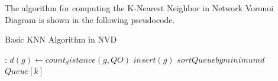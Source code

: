 The algorithm for computing the K-Nearest Neighbor in Network Voronoi Diagram is shown in the following pseudocode.

\begin{algorithm}
\caption{Basic KNN Algorithm in NVD}
\begin{algorithmic}[1]
:
	\State $d(g) \gets count_distance(g, QO)$
	\State $insert(g)$
\EndFor
\State $sort Queue by minimum d$
\Return $Queue[k]$
\EndFunction
\end{algorithmic}
\end{algorithm}
